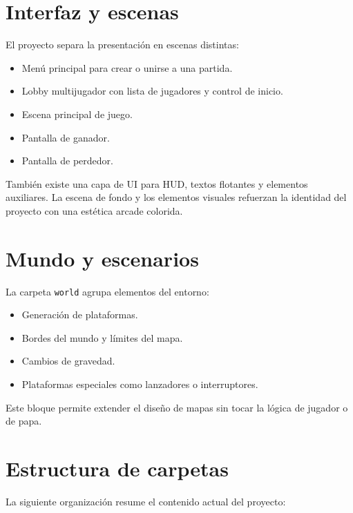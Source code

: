 \documentclass[11pt,a4paper]{article}
\begin{document}
\section{Interfaz y escenas}
El proyecto separa la presentación en escenas distintas:
\begin{itemize}[nosep]
    \item Menú principal para crear o unirse a una partida.
    \item Lobby multijugador con lista de jugadores y control de inicio.
    \item Escena principal de juego.
    \item Pantalla de ganador.
    \item Pantalla de perdedor.
\end{itemize}

También existe una capa de UI para HUD, textos flotantes y elementos auxiliares. La escena de fondo y los elementos visuales refuerzan la identidad del proyecto con una estética arcade colorida.

\section{Mundo y escenarios}
La carpeta \texttt{world} agrupa elementos del entorno:
\begin{itemize}[nosep]
    \item Generación de plataformas.
    \item Bordes del mundo y límites del mapa.
    \item Cambios de gravedad.
    \item Plataformas especiales como lanzadores o interruptores.
\end{itemize}

Este bloque permite extender el diseño de mapas sin tocar la lógica de jugador o de papa.

\section{Estructura de carpetas}
La siguiente organización resume el contenido actual del proyecto:
\end{document}
